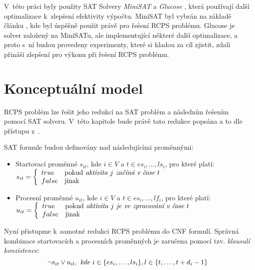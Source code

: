 \documentclass[a4paper, 12pt]{article}
\begin{document}
V~této práci byly použity SAT Solvery \emph{MiniSAT} \cite{www:minisat} a \emph{Glucose} \cite{www:glucose}, která
používají další optimalizace k~zlepšení efektivity výpočtu.
MiniSAT byl vybrán na základě článku \cite{horbach:10}, kde byl úspěšně použit právě pro řešení RCPS problému.
Glucose je solver založený na MiniSATu, ale implementující některé další optimalizace, a proto s~ní budou provedeny
experimenty, které si kladou za cíl zjistit, zdali přináší zlepšení pro výkonu při řešení RCPS problému.

\section{Konceptuální model}
RCPS problém lze řešit jeho redukcí na SAT problém a následním řešením pomocí SAT solveru.
V~této kapitole bude právě tato redukce popsána a to dle přístupu z~\cite{horbach:10}.

SAT formule budou definovány nad následujícími proměnnými:
\begin{itemize}
    \item Startovací proměnné $s_{it}$, kde $i\in V$ a $t\in{es_i,\ldots,ls_i}$, pro které platí: \newline 
    $s_{it}=
        \left\{
        \begin{array}{ll}
             true & \mbox{pokud} \emph{ aktivita }j \emph{ začíná v~čase }t \\
             false & \mbox{jinak}\\
        \end{array}
        \right.
        $
    \item Procesní proměnné $u_{it}$, kde $i \in V$ a $t \in {es_i,\ldots, lf_i}$, pro které platí: \newline
    $u_{it}=
        \left\{
        \begin{array}{ll}
             true & \mbox{pokud} \emph{ aktivita }j \emph{ je ve zpracování  v~čase }t \\
             false & \mbox{jinak}\\
        \end{array}
        \right.
        $
\end{itemize}

Nyní přistupme k~samotné redukci RCPS problému do CNF formulí.
Správná kombinace startovacích a procesních proměnných je zaručena pomocí tzv. \emph{klausulí konzistence}:
\begin{equation}
\label{eq:1}
   \neg s_{it} \vee u_{il},\emph{ kde } i\in\{es_i,\ldots,ls_i\}, l\in\{t,\ldots,t+d_i-1\}  
\end{equation}
\end{document}
